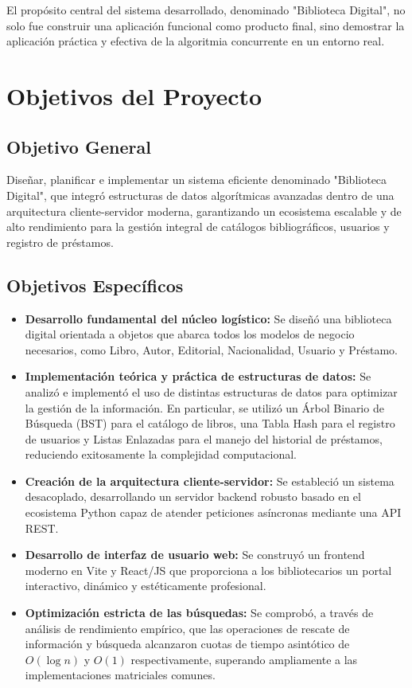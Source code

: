 \documentclass{rapport}
\begin{document}
El propósito central del sistema desarrollado, denominado "Biblioteca Digital", no solo fue construir una aplicación funcional como producto final, sino demostrar la aplicación práctica y efectiva de la algoritmia concurrente en un entorno real.

\section{Objetivos del Proyecto}

\subsection{Objetivo General}
Diseñar, planificar e implementar un sistema eficiente denominado "Biblioteca Digital", que integró estructuras de datos algorítmicas avanzadas dentro de una arquitectura cliente-servidor moderna, garantizando un ecosistema escalable y de alto rendimiento para la gestión integral de catálogos bibliográficos, usuarios y registro de préstamos.

\subsection{Objetivos Específicos}
\begin{itemize}
    \item \textbf{Desarrollo fundamental del núcleo logístico:} Se diseñó una biblioteca digital orientada a objetos que abarca todos los modelos de negocio necesarios, como Libro, Autor, Editorial, Nacionalidad, Usuario y Préstamo.
    \item \textbf{Implementación teórica y práctica de estructuras de datos:} Se analizó e implementó el uso de distintas estructuras de datos para optimizar la gestión de la información. En particular, se utilizó un Árbol Binario de Búsqueda (BST) para el catálogo de libros, una Tabla Hash para el registro de usuarios y Listas Enlazadas para el manejo del historial de préstamos, reduciendo exitosamente la complejidad computacional.
    \item \textbf{Creación de la arquitectura cliente-servidor:} Se estableció un sistema desacoplado, desarrollando un servidor backend robusto basado en el ecosistema Python capaz de atender peticiones asíncronas mediante una API REST.
    \item \textbf{Desarrollo de interfaz de usuario web:} Se construyó un frontend moderno en Vite y React/JS que proporciona a los bibliotecarios un portal interactivo, dinámico y estéticamente profesional.
    \item \textbf{Optimización estricta de las búsquedas:} Se comprobó, a través de análisis de rendimiento empírico, que las operaciones de rescate de información y búsqueda alcanzaron cuotas de tiempo asintótico de $O(\log n)$ y $O(1)$ respectivamente, superando ampliamente a las implementaciones matriciales comunes.
\end{itemize}
\end{document}
